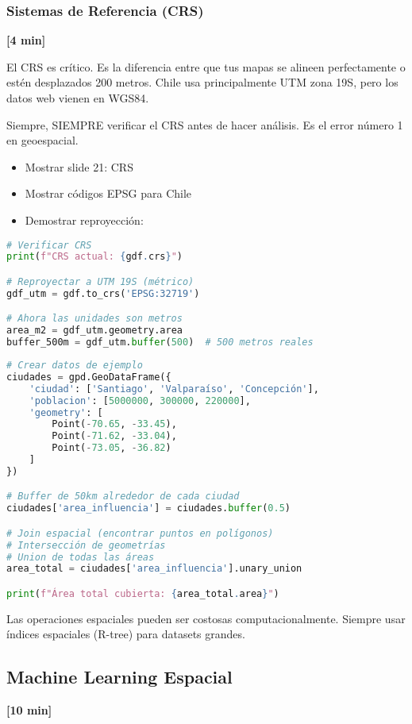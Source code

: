 \documentclass[11pt,a4paper]{article}
\newcommand{\tiempo}[1]{\textcolor{timecolor}{\textbf{[#1]}}}
\newcommand{\decir}[1]{\begin{tcolorbox}[colback=blue!5,colframe=usachblue,title={DECIR}]#1\end{tcolorbox}}
\newcommand{\hacer}[1]{\begin{tcolorbox}[colback=green!5,colframe=green!50!black,title={HACER}]#1\end{tcolorbox}}
\newcommand{\alerta}[1]{\begin{tcolorbox}[colback=red!5,colframe=red,title={ALERTA}]#1\end{tcolorbox}}
\begin{document}
\subsubsection{Sistemas de Referencia (CRS)} \tiempo{4 min}

\decir{
El CRS es crítico. Es la diferencia entre que tus mapas se alineen perfectamente o estén desplazados 200 metros. Chile usa principalmente UTM zona 19S, pero los datos web vienen en WGS84.

Siempre, SIEMPRE verificar el CRS antes de hacer análisis. Es el error número 1 en geoespacial.
}

\hacer{
\begin{itemize}
    \item Mostrar slide 21: CRS
    \item Mostrar códigos EPSG para Chile
    \item Demostrar reproyección:
\end{itemize}
}

\begin{lstlisting}[language=Python]
# Verificar CRS
print(f"CRS actual: {gdf.crs}")

# Reproyectar a UTM 19S (métrico)
gdf_utm = gdf.to_crs('EPSG:32719')

# Ahora las unidades son metros
area_m2 = gdf_utm.geometry.area
buffer_500m = gdf_utm.buffer(500)  # 500 metros reales
\end{lstlisting}

\begin{lstlisting}[language=Python]
# Crear datos de ejemplo
ciudades = gpd.GeoDataFrame({
    'ciudad': ['Santiago', 'Valparaíso', 'Concepción'],
    'poblacion': [5000000, 300000, 220000],
    'geometry': [
        Point(-70.65, -33.45),
        Point(-71.62, -33.04),
        Point(-73.05, -36.82)
    ]
})

# Buffer de 50km alrededor de cada ciudad
ciudades['area_influencia'] = ciudades.buffer(0.5)

# Join espacial (encontrar puntos en polígonos)
# Intersección de geometrías
# Union de todas las áreas
area_total = ciudades['area_influencia'].unary_union

print(f"Área total cubierta: {area_total.area}")
\end{lstlisting}

\alerta{
Las operaciones espaciales pueden ser costosas computacionalmente. 
Siempre usar índices espaciales (R-tree) para datasets grandes.
}

\subsection{Machine Learning Espacial} \tiempo{10 min}
\end{document}
